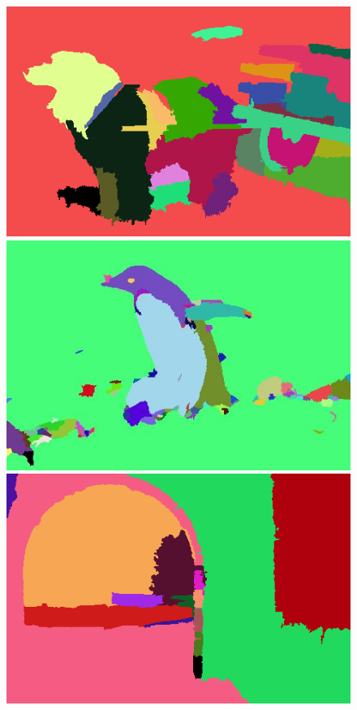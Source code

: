 \begin{figure}[h]
{\begin{minipage}[b]{0.13\linewidth}
\includegraphics[width=1\linewidth]{figures/img/DEL/DEL_247012.png}
\includegraphics[width=1\linewidth]{figures/img/DEL/DEL_106005.jpg}
\includegraphics[width=1\linewidth]{figures/img/DEL/DEL_5096.png}

\end{minipage}}
\end{figure}
